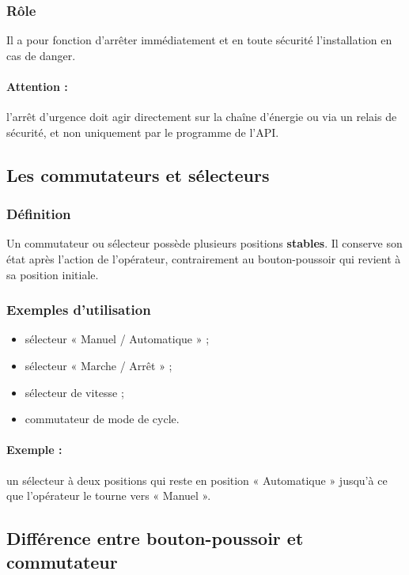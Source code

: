 \subsubsection{Rôle}

Il a pour fonction d'arrêter immédiatement et en toute sécurité l'installation en cas de danger.

\paragraph{Attention :} l'arrêt d'urgence doit agir directement sur la chaîne d'énergie ou via un relais de sécurité, et non uniquement par le programme de l'API.

\subsection{Les commutateurs et sélecteurs}

\subsubsection{Définition}

Un commutateur ou sélecteur possède plusieurs positions \textbf{stables}. Il conserve son état après l'action de l'opérateur, contrairement au bouton-poussoir qui revient à sa position initiale.

\subsubsection{Exemples d'utilisation}

\begin{itemize}
    \item sélecteur « Manuel / Automatique » ;
    \item sélecteur « Marche / Arrêt » ;
    \item sélecteur de vitesse ;
    \item commutateur de mode de cycle.
\end{itemize}

\paragraph{Exemple :} un sélecteur à deux positions qui reste en position « Automatique » jusqu'à ce que l'opérateur le tourne vers « Manuel ».

\subsection{Différence entre bouton-poussoir et commutateur}


